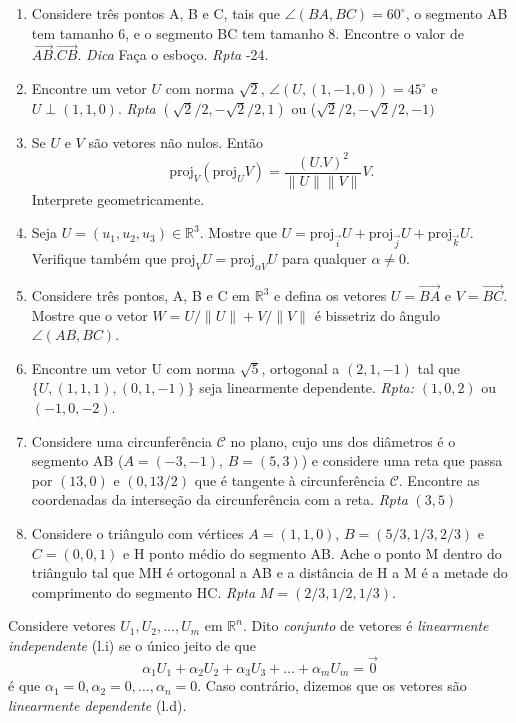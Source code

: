 \documentclass{article}
\theoremstyle{plain}
\theoremstyle{definition}
\theoremstyle{remark}
\begin{document}
\begin{enumerate}
    \item Considere três pontos A, B e C, tais que 
    $\angle (BA, BC)= 60^{\circ}$, o segmento AB tem tamanho $6$, 
    e o segmento BC tem tamanho $8$. 
    Encontre o valor de $\overrightarrow{AB}.\overrightarrow{CB}$.
    {\it Dica} Faça o esboço. {\it Rpta} -24.
   \item Encontre um vetor $U$ com norma $\sqrt{2}$, 
   $\angle (U,(1,-1,0))=45^{\circ}$ e $U \perp (1,1,0)$.
   {\it Rpta} 
   $(\sqrt{2}/2, -\sqrt{2}/2,1)$ ou ($\sqrt{2}/2, -\sqrt{2}/2,-1)$
   \item Se $U$ e $V$ são vetores não nulos. Então 
   $$ \text{proj}_{V}(\text{proj}_{U}V)=\frac{(U.V)^{2}}{\|U\|\|V\|}V.$$
   Interprete geometricamente.
   \item Seja $U=(u_1,u_2,u_3) \in \mathbb{R}^{3}$. Mostre que 
      $U=\text{proj}_{\overrightarrow{i}}U+
      \text{proj}_{\overrightarrow{j}}U+
      \text{proj}_{\overrightarrow{k}}U$. 
      Verifique também que
      $\text{proj}_{V}U=\text{proj}_{\alpha V}U$ 
      para qualquer $\alpha \neq 0$.
   \item Considere três pontos, A, B e C em $\mathbb{R}^{3}$
   e  defina os vetores $U=\overrightarrow{BA}$ e 
   $V=\overrightarrow{BC}$. Mostre que o vetor 
   $W=U/\|U\|+V/\|V\|$
   é bissetriz do ângulo $\angle (AB, BC)$.
   \item Encontre um vetor U com norma $\sqrt{5}$, ortogonal a $(2,1,-1)$
   tal que $\{U, (1,1,1), (0,1,-1)\}$ seja linearmente dependente.
   {\it Rpta:} $(1,0,2)$ ou $(-1,0,-2)$.
   \item 
   Considere uma circunferência $\mathcal{C}$ no plano, cujo uns dos diâmetros é o segmento AB 
   ($A=(-3,-1)$, $B=(5,3)$) e considere uma reta que passa por $(13,0)$
   e $(0,13/2)$ que é tangente à circunferência $\mathcal{C}$. 
   Encontre as coordenadas da interseção da circunferência com a reta.
   {\it Rpta} $(3,5)$
   \item Considere o triângulo com vértices $A=(1,1,0)$, 
   $B=(5/3,1/3,2/3)$ e $C=(0,0,1)$ e H ponto médio do segmento AB.
   Ache o ponto M dentro do triângulo tal que MH é ortogonal a AB
   e a distância de H a M é a metade do comprimento do segmento HC. {\it Rpta} 
   $M=(2/3,1/2,1/3)$.
   \end{enumerate}
   
Considere vetores $U_1, U_2, \dots, U_m$ em $\mathbb{R}^{n}$.
Dito {\it conjunto} de vetores é {\it linearmente independente} (l.i) se 
 o único jeito de que
 $$\alpha_1 U_1+ \alpha_2 U_2+\alpha_3 U_3+\dots + \alpha_m U_m=\overrightarrow{0}$$ 
 é que $\alpha_1=0, \alpha_2=0, \dots, \alpha_n=0$.
 Caso contrário, dizemos que os vetores são {\it linearmente dependente} (l.d).
 
\end{document}
